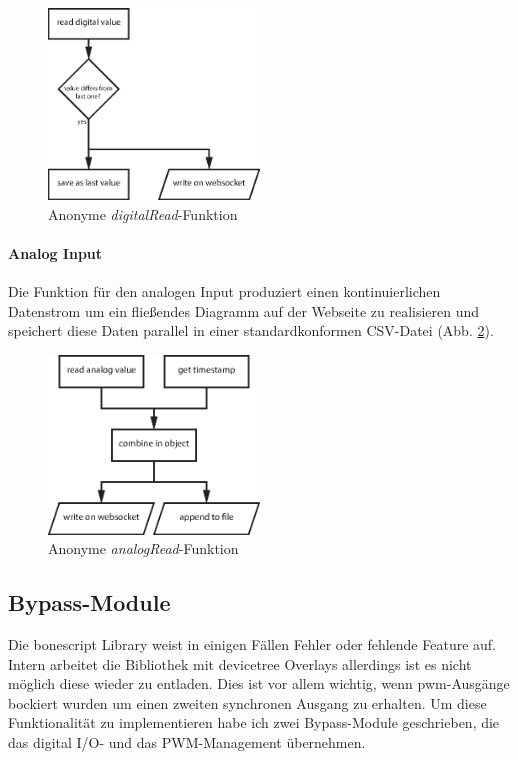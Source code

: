 \begin{figure}[H]
  \centering
  \includegraphics[width = 0.5\textwidth]{documentation/images/wssTimerDigital.eps}
  \caption{Anonyme \textit{digitalRead}-Funktion}
  \label{fig:wssTimerDigital}
\end{figure}

\paragraph{Analog Input} Die Funktion für den analogen Input produziert einen kontinuierlichen Datenstrom um ein fließendes Diagramm auf der Webseite zu realisieren und speichert diese Daten parallel in einer standardkonformen CSV-Datei \cite{rfc4180} (Abb. \ref{fig:wssTimerAnalog}).

\begin{figure}[H]
  \centering
  \includegraphics[width = 0.5\textwidth]{documentation/images/wssTimerAnalog.eps}
  \caption{Anonyme \textit{analogRead}-Funktion}
  \label{fig:wssTimerAnalog}
\end{figure}

\subsection{Bypass-Module}
Die bonescript Library weist in einigen Fällen Fehler oder fehlende Feature auf. Intern arbeitet die Bibliothek mit \gls{devicetree} Overlays allerdings ist es nicht möglich diese wieder zu entladen. Dies ist vor allem wichtig, wenn \gls{pwm}-Ausgänge bockiert wurden um einen zweiten synchronen Ausgang zu erhalten. Um diese Funktionalität zu implementieren habe ich zwei Bypass-Module geschrieben, die das digital I/O- und das PWM-Management übernehmen.

